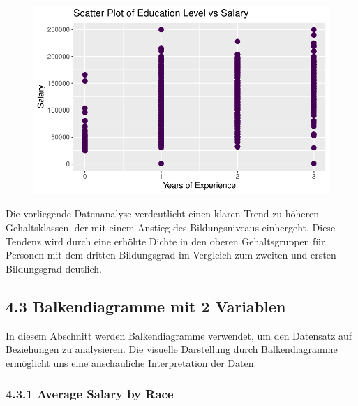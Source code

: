 \documentclass[
  letterpaper,
  DIV=11,
  numbers=noendperiod]{scrartcl}
\begin{document}
\begin{figure}[H]

{\centering \includegraphics{main_doc_files/figure-pdf/unnamed-chunk-29-1.pdf}

}

\end{figure}

Die vorliegende Datenanalyse verdeutlicht einen klaren Trend zu höheren
Gehaltsklassen, der mit einem Anstieg des Bildungsniveaus einhergeht.
Diese Tendenz wird durch eine erhöhte Dichte in den oberen
Gehaltsgruppen für Personen mit dem dritten Bildungsgrad im Vergleich
zum zweiten und ersten Bildungsgrad deutlich.

\hypertarget{balkendiagramme-mit-2-variablen}{%
\subsection{4.3 Balkendiagramme mit 2
Variablen}\label{balkendiagramme-mit-2-variablen}}

In diesem Abschnitt werden Balkendiagramme verwendet, um den Datensatz
auf Beziehungen zu analysieren. Die visuelle Darstellung durch
Balkendiagramme ermöglicht uns eine anschauliche Interpretation der
Daten.

\hypertarget{average-salary-by-race}{%
\subsubsection{4.3.1 Average Salary by
Race}\label{average-salary-by-race}}
\end{document}
